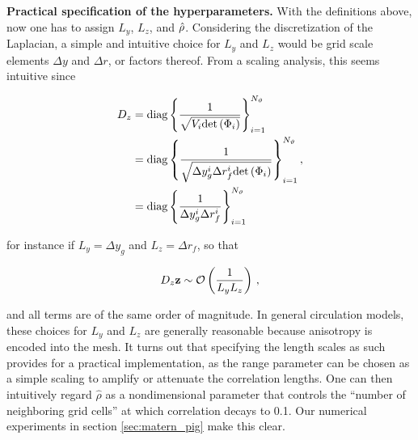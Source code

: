 \noindent\textbf{Practical specification of the hyperparameters.}
With the definitions above, now one has to assign $L_y$, $L_z$, and $\hat{\rho}$.
Considering the discretization of the Laplacian, a simple and intuitive choice
for $L_y$ and $L_z$ would be grid scale elements $\Delta y$ and $\Delta r$,
or factors thereof.
From a scaling analysis, this seems intuitive since
\begin{linenomath*}\begin{equation*}
    \begin{aligned}
        D_z
        &=
        \text{diag}\left\{\dfrac{1}{
            \sqrt{V_i\text{det}\left(\Phi_{i}\right)}}\right\}_{i=1}^{N_{\vartheta}} \\
        &=
        \text{diag}\left\{\dfrac{1}{
            \sqrt{\Delta y_{g}^{i}\Delta r_{f}^{i}
        \text{det}\left(\Phi_{i}\right)}}\right\}_{i=1}^{N_{\vartheta}} \\
        &= \text{diag}\left\{\dfrac{1}{
            \Delta y_{g}^{i}\Delta r_{f}^{i}}\right\}_{i=1}^{N_{\vartheta}}
    \end{aligned}\, ,
\end{equation*}\end{linenomath*}
for instance if $L_y=\Delta y_g$ and $L_z=\Delta r_f$, so that
\begin{linenomath*}\begin{equation*}
    D_z\mathbf{z} \sim \mathcal{O}\left(\dfrac{1}{L_y L_z}\right) \, ,
\end{equation*}\end{linenomath*}
and all terms are of the same order of magnitude.
In general circulation models, these choices for $L_y$ and $L_z$ are generally
reasonable because anisotropy is encoded into the mesh.
It turns out that specifying the length scales as such provides for a
practical implementation, as the range parameter can be chosen as a simple
scaling to amplify or attenuate the correlation lengths.
One can then intuitively regard $\hat\rho$ as a nondimensional parameter that
controls the
``number of neighboring grid cells'' at which correlation decays to 0.1.
Our numerical experiments in section \ref{sec:matern_pig} make this clear.
